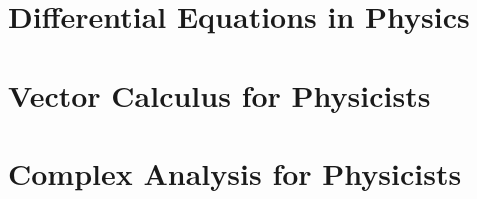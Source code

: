 \part{Differential Equations in Physics}

\part{Vector Calculus for Physicists}

\part{Complex Analysis for Physicists}

